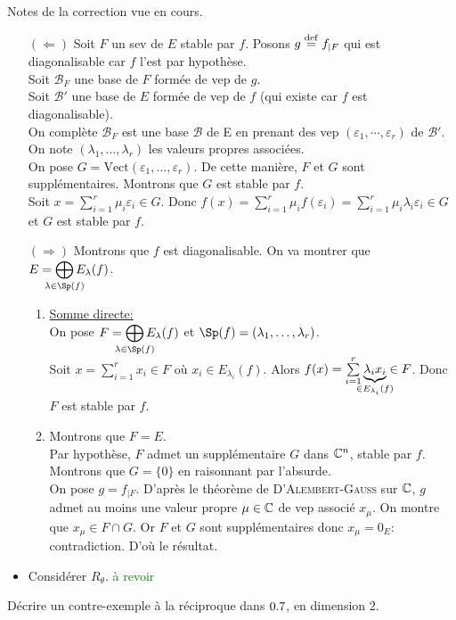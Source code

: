 Notes de la correction vue en cours.
\begin{preuve}
    \begin{itemize}
        \item[$(\Leftarrow)$] Soit $F$ un sev de $E$ stable par $f$.
        Posons $g \overset{\mathrm{\tiny def}}{=} f_{\vert F}$ qui est diagonalisable car $f$ l'est par hypothèse. \\
        Soit $\mathscr{B}_F$ une base de $F$ formée de vep de $g$. \\
        Soit $\mathscr{B}'$ une base de $E$ formée de vep de $f$ (qui existe car $f$ est diagonalisable). \\
        On complète $\mathscr{B}_F$ est une base $\mathscr{B}$ de E en prenant des vep $(\varepsilon_1, \cdots, \varepsilon_r)$ de $\mathscr{B}'$. On note $(\lambda_1, \dots, \lambda_r)$ les valeurs propres associées. \\
        On pose $G = \mathrm{Vect}(\varepsilon_1, \dots, \varepsilon_r)$. De cette manière, $F$ et $G$ sont supplémentaires. Montrons que $G$ est stable par $f$. \\
        Soit $x = \sum\limits_{i=1}^{r} \mu_i \varepsilon_i \in G$. Donc $f(x) = \sum\limits_{i=1}^{r} \mu_i f(\varepsilon_i) =  \sum\limits_{i=1}^{r} \mu_i \lambda_i \varepsilon_i \in G$ et $G$ est stable par $f$.
    
        \item[$(\Rightarrow)$] Montrons que $f$ est diagonalisable. On va montrer que $E = \smashoperator{\bigoplus\limits_{\lambda \in \Sp(f)}} E_\lambda (f)$.
        
        \begin{enumerate}
            \item \underline{Somme directe:} \\
            On pose $F = \smashoperator{\bigoplus\limits_{\lambda \in \Sp(f)}} E_\lambda (f)$ et $\Sp(f) = (\lambda_1, \dots, \lambda_r)$. \\
            Soit $x = \sum\limits_{i=1}^{r} x_i \in F$ où $x_i \in E_{\lambda_i}(f)$. Alors $f(x) = \sum\limits_{i=1}^{r} \underbrace{\lambda_i x_i}_{\mathclap{\in E_{\lambda_i}(f)}} \in F$. Donc $F$ est stable par $f$.
            \item Montrons que $F = E$. \\
            Par hypothèse, $F$ admet un supplémentaire $G$ dans $\mathbb{C}^n$, stable par $f$. Montrons que $G = \{0\}$ en raisonnant par l'absurde. \\
            On pose $g = f_{\vert F}$. D'après le théorème de \textsc{D'Alembert-Gauss} sur $\mathbb{C}$, $g$ admet au moins une valeur propre $\mu \in \mathbb{C}$ de vep associé $x_\mu$. On montre que $x_\mu \in F \cap G$. Or $F$ et $G$ sont supplémentaires donc $x_\mu = 0_E$: contradiction. D'où le résultat. 
        \end{enumerate}
        \item Considérer $R_\theta$. \textcolor{green}{à revoir}
    \end{itemize}
\end{preuve}

\begin{exercice}
    Décrire un contre-exemple à la réciproque dans $0.7$, en dimension 2.
\end{exercice}  